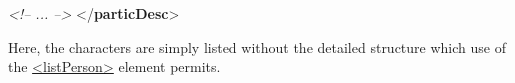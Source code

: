 \begin{shaded}
\hspace*{1em}\hspace*{1em}\mbox{}\newline 
\textit{<!-- ... -->}\mbox{}\newline 
\hspace*{1em}\mbox{}\newline 
{}\mbox{}\newline 
{</\textbf{particDesc}>}\end{shaded}\egroup\par \noindent  Here, the characters are simply listed without the detailed structure which use of the \hyperref[TEI.listPerson]{<listPerson>} element permits.
